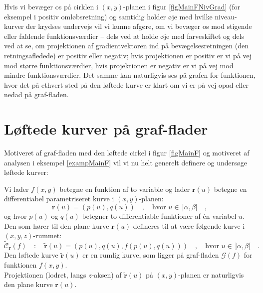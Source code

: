 \begin{think}
Hvis vi bevæger os på cirklen i $(x,y)$-planen i figur \ref{figMainFNivGrad} (for eksempel i positiv omløbsretning) og samtidig holder øje med hvilke niveau-kurver der krydses undervejs vil vi kunne afgøre, om vi bevæger os mod stigende eller faldende funktionsværdier -- dels ved at holde øje med farveskiftet og dels ved at se, om projektionen af gradientvektoren ind på bevægelsesretningen (den retningsafledede) er positiv eller negativ; hvis projektionen er positiv er vi på vej mod større funktionsværdier, hvis projektionen er negativ er vi på vej mod mindre funktionsværdier. Det samme kan naturligvis ses på grafen for funktionen, hvor det på ethvert sted på den løftede kurve er klart om vi er på vej opad eller nedad på graf-fladen.
\end{think}

\section{Løftede kurver på graf-flader}
Motiveret af graf-fladen med den løftede cirkel i figur \ref{figMainF} og motiveret af analysen i eksempel \ref{exampMainF} vil vi nu helt generelt definere og undersøge
løftede kurver:

\begin{definition}
Vi lader $f(x,y)$ betegne en funktion af to variable og lader $\mathbf{r}(u)$ betegne en differentiabel parametriseret kurve  i $(x,y)$-planen:
\begin{equation}
\mathbf{r}(u) = (p(u), q(u)) \quad , \quad \textrm{hvor $u \in \, ]\alpha, \beta[ \quad ,$}
\end{equation}
og hvor $p(u)$ og $q(u)$ betegner to differentiable funktioner af \'{e}n variabel $u$.\\

Den  som hører til den plane kurve $\mathbf{r}(u)$ defineres til at være følgende kurve i $(x, y, z)$-rummet:
\begin{equation}
\widetilde{\mathcal{C}}_{\mathbf{r}}(f) \quad : \quad \widetilde{\mathbf{r}}(u) = (p(u), q(u), f(p(u), q(u))) \quad , \quad \textrm{hvor $u \in \, ]\alpha, \beta[ $} \quad .
\end{equation}
Den løftede kurve $\widetilde{\mathbf{r}}(u)$ er en rumlig kurve, som ligger på graf-fladen $\mathcal{G}(f)$ for funktionen $f(x,y)$.\\

Projektionen (lodret, langs $z$-aksen) af $\widetilde{\mathbf{r}}(u)$ på $(x,y)$-planen er naturligvis den plane kurve $\mathbf{r}(u)$.
\end{definition}

